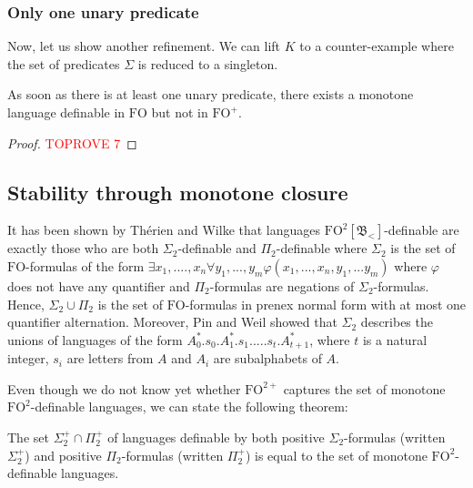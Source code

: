 \documentclass[a4paper,UKenglish,cleveref, autoref, thm-restate]{lipics-v2021}
\newcommand{\FO}{\mathrm{FO}}
\newcommand{\FOp}{\FO^+}
\newcommand{\FOtw}{\FO^2}
\newcommand{\FOtwp}{\FO^{2+}}
\newcommand{\bin}{\mathfrak{B}}
\begin{document}
\subsubsection{Only one unary predicate}\label{sec:onepred}


Now, let us show another refinement.
We can lift $K$ to a counter-example where the set of predicates $\Sigma$ is reduced to a singleton.

\begin{proposition} \label{prop:onepred}
    As soon as there is at least one unary predicate, there exists a monotone language definable in $\FO$ but not in $\FOp$.
\end{proposition}




\begin{proof}\textcolor{red}{TOPROVE 7}\end{proof}



\subsection{Stability through monotone closure} \label{sec:stability}




It has been shown by Thérien and Wilke \cite{OneQuantifierAlternation} that languages $\FOtw[\bin_<]$-definable are exactly those who are both $\Sigma_2$-definable and $\Pi_2$-definable where $\Sigma_2$ is the set of $\FO$-formulas of the form $\exists x_1,....,x_n \forall y_1,...,y_m \varphi(x_1,...,x_n,y_1,...y_m)$ where $\varphi$ does not have any quantifier and $\Pi_2$-formulas are negations of $\Sigma_2$-formulas.
Hence, $\Sigma_2 \cup \Pi_2$ is the set of $\FO$-formulas in prenex normal form with at most one quantifier alternation.
Moreover, Pin and Weil \cite{PolynomialClosure} showed that $\Sigma_2$ describes the unions of languages of the form $A_0^*.s_0.A_1^*.s_1.....s_t.A_{t+1}^*$, where $t$ is a natural integer, $s_i$ are letters from $A$ and $A_i$ are subalphabets of $A$.

Even though we do not know yet whether $\FOtwp$ captures the set of monotone $\FOtw$-definable languages, we can state the following theorem:

\begin{theorem} \label{thm:sigpimon}
    The set $\Sigma_2^+ \cap \Pi_2^+$ of languages definable by both positive $\Sigma_2$-formulas (written $\Sigma_2^+$) and positive $\Pi_2$-formulas (written $\Pi_2^+$) is equal to the set of monotone $\FOtw$-definable languages.
\end{theorem}
\end{document}
